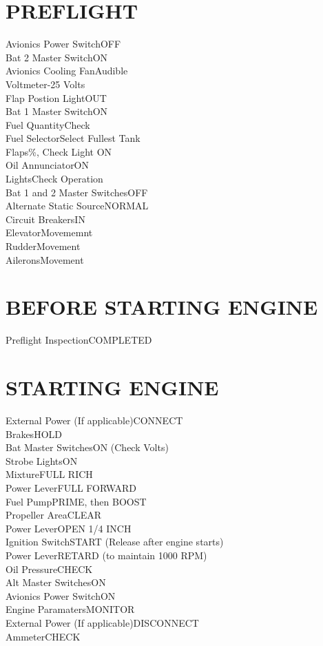 \documentclass{article}
\begin{document}
\begin{multicols*}{2}
\section*{PREFLIGHT}
Avionics Power Switch\dotfill OFF\\
Bat 2 Master Switch\dotfill ON\\
Avionics Cooling Fan\dotfill Audible\\
Voltmeter-25 Volts\\
Flap Postion Light\dotfill OUT\\
Bat 1 Master Switch\dotfill ON\\
Fuel Quantity\dotfill Check\\
Fuel Selector\dotfill Select Fullest Tank\\
Flaps\%, Check Light ON\\
Oil Annunciator\dotfill ON\\
Lights\dotfill Check Operation\\
Bat 1 and 2 Master Switches\dotfill OFF\\
Alternate Static Source\dotfill NORMAL\\
Circuit Breakers\dotfill IN\\
Elevator\dotfill Movememnt\\
Rudder\dotfill Movement\\
Ailerons\dotfill Movement
\section*{BEFORE STARTING ENGINE}
Preflight Inspection\dotfill COMPLETED
\section*{STARTING ENGINE}
External Power (If applicable)\dotfill CONNECT\\
Brakes\dotfill HOLD\\
Bat Master Switches\dotfill ON (Check Volts)\\
Strobe Lights\dotfill ON\\
Mixture\dotfill FULL RICH\\
Power Lever\dotfill FULL FORWARD\\
Fuel Pump\dotfill PRIME, then BOOST\\
Propeller Area\dotfill CLEAR\\
Power Lever\dotfill OPEN 1/4 INCH\\
Ignition Switch\dotfill START (Release after engine starts)\\
Power Lever\dotfill RETARD (to maintain 1000 RPM)\\
Oil Pressure\dotfill CHECK\\
Alt Master Switches\dotfill ON\\
Avionics Power Switch\dotfill ON\\
Engine Paramaters\dotfill MONITOR\\
External Power (If applicable)\dotfill DISCONNECT\\
Ammeter\dotfill CHECK

\end{multicols*}
\end{document}
